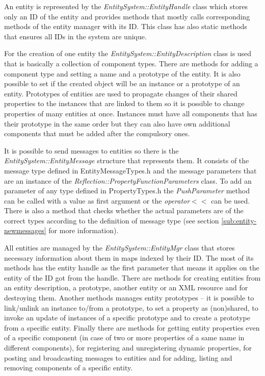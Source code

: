 An entity is represented by the \emph{EntitySystem::EntityHandle} class which sto\-res only an ID of the entity and provides methods that mostly calls corresponding methods of the entity manager with its ID. This class has also static methods that ensures all IDs in the system are unique.

For the creation of one entity the \emph{EntitySystem::EntityDescription} class is used that is basically a collection of component types. There are methods for adding a component type and setting a name and a prototype of the entity. It is also possible to set if the created object will be an instance or a prototype of an entity. Prototypes of entities are used to propagate changes of their shared properties to the instances that are linked to them so it is possible to change properties of many entities at once. Instances must have all components that has their prototype in the same order but they can also have own additional components that must be added after the compulsory ones.

It is possible to send messages to entities so there is the \emph{EntitySystem::EntityMessage} structure that represents them. It consists of the message type defined in EntityMessageTypes.h and the message parameters that are an instance of the \emph{Reflection::PropertyFunctionParameters} class. To add an parameter of any type defined in PropertyTypes.h the \emph{PushParameter} method can be called with a value as first argument or the \emph{operator}$<<$ can be used. There is also a method that checks whether the actual parameters are of the correct types according to the definition of message type (see section \ref{sub:entity-newmessages} for more information).

All entities are managed by the \emph{EntitySystem::EntityMgr} class that stores necessary information about them in maps indexed by their ID. The most of its methods has the entity handle as the first parameter that means it applies on the entity of the ID got from the handle. There are methods for creating entities from an entity description, a prototype, another entity or an XML resource and for destroying them. Another methods manages entity prototypes -- it is possible to link/unlink an instance to/from a prototype, to set a property as (non)shared, to invoke an update of instances of a specific prototype and to create a prototype from a specific entity. Finally there are methods for getting entity properties even of a specific component (in case of two or more properties of a same name in different components), for registering and unregistering dynamic properties, for posting and broadcasting messages to entities and for adding, listing and removing components of a specific entity.

